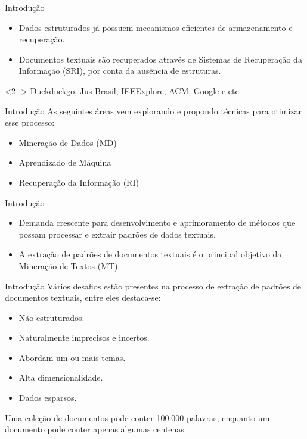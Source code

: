 \documentclass[brazil]{beamer}
\begin{document}
\begin{frame}{Introdução}
  \begin{itemize}
    \item<1 -> Dados estruturados já possuem mecanismos eficientes de armazenamento e recuperação.
    \item<2 -> \alert{Documentos textuais} são recuperados através de Sistemas de Recuperação da
      Informação (SRI), por conta da \alert{ausência de estruturas}. 
  \end{itemize}
  \begin{examples}<2 ->
    Duckduckgo, Jus Brasil, IEEExplore, ACM, Google e etc 
  \end{examples}
\end{frame}

\begin{frame}{Introdução}
  As seguintes áreas vem explorando e propondo técnicas para otimizar esse processo: 
  \begin{itemize}
    \item Mineração de Dados (MD) 
    \item Aprendizado de Máquina  
    \item Recuperação da Informação (RI)
  \end{itemize}
\end{frame}

\begin{frame}{Introdução}
  \begin{itemize}
    \item Demanda crescente para desenvolvimento e aprimoramento de métodos que possam
      processar e \alert{extrair padrões} de \alert{dados textuais}. 
    \item A extração de padrões de documentos textuais é o principal objetivo da Mineração de Textos
      (MT).
  \end{itemize}
\end{frame}

\begin{frame}{Introdução}
  Vários desafios estão presentes na processo de extração de padrões de documentos textuais, entre
  eles destaca-se:
  \begin{itemize}
    \item Não estruturados.
    \item Naturalmente \alert{imprecisos} e \alert{incertos}. 
    \item Abordam um ou mais temas. 
    \item \alert{Alta dimensionalidade}.
    \item Dados \alert{esparsos}.
  \end{itemize}
  \begin{examples}
    Uma coleção de documentos pode conter 100.000 palavras, enquanto um documento pode conter apenas
    algumas centenas \cite{Aggarwal2012}.
  \end{examples}
\end{frame}
\end{document}
